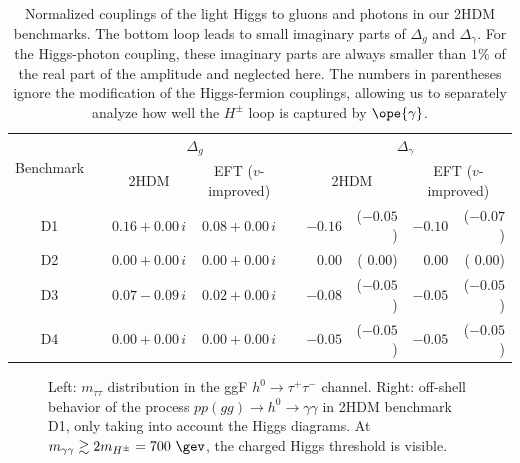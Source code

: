\begin{table}[t] \renewcommand{\arraystretch}{1.2} \centering
  \begin{tabular}{c c cc c rrrr} \toprule \multirow{2}{*}{Benchmark}
&\hspace*{1em}& \multicolumn{2}{c}{$\Delta_g$} &\hspace*{1em}&
\multicolumn{4}{c}{$\Delta_\gamma$} \\ \cmidrule{3-4} \cmidrule{6-9}
&& 2HDM & EFT ($v$-improved) && \multicolumn{2}{c}{2HDM} &
\multicolumn{2}{c}{EFT ($v$-improved)} \\ \midrule D1 && $0.16 + 0.00
\,i$ & $0.08 + 0.00 \,i$ &&$-0.16$ & ($-0.05$) & $-0.10$ & ($-0.07$)
\\ D2 && $0.00 + 0.00 \,i$ & $0.00 + 0.00 \,i$ && 0.00 & ( 0.00) &
0.00 & ( 0.00) \\ D3 && $0.07 - 0.09 \,i$ & $0.02 + 0.00 \,i$ &&
$-0.08$ & ($-0.05$) & $-0.05$ & ($-0.05$) \\ D4 && $0.00 + 0.00 \,i$ &
$0.00 + 0.00 \,i$ && $-0.05$ & ($-0.05$) & $-0.05$ & ($-0.05$) \\
\bottomrule
  \end{tabular}
  \caption{Normalized couplings of the light Higgs to gluons and
photons in our 2HDM benchmarks.  The bottom loop leads to small
imaginary parts of $\Delta_g$ and $\Delta_\gamma$.  For the
Higgs-photon coupling, these imaginary parts are always smaller than
$1\%$ of the real part of the amplitude and neglected here.  The
numbers in parentheses ignore the modification of the Higgs-fermion
couplings, allowing us to separately analyze how well the $H^\pm$ loop
is captured by $\ope{\gamma}$.}
  \label{tab:2HDM_couplings_loop}
\end{table}

\begin{figure}[tp] \centering
  \caption{Left: $m_{\tau \tau}$ distribution in the ggF $h^0 \to
\tau^+ \tau^-$ channel.  Right: off-shell behavior of the process $p p
(gg) \to h^0 \to \gamma \gamma$ in 2HDM benchmark D1, only taking into
account the Higgs diagrams. At $m_{\gamma \gamma} \gtrsim 2 m_{H^\pm}
= 700\ \gev$, the charged Higgs threshold is visible.}
  \label{fig:validity_2HDM_resolve_HAA}
\end{figure}

